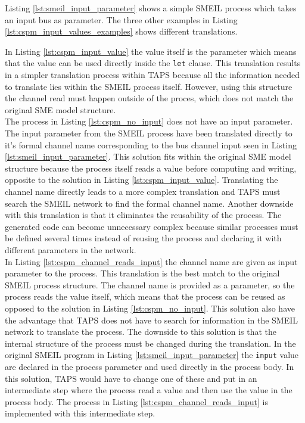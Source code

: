 Listing \ref{lst:smeil_input_parameter} shows a simple SMEIL process which takes an input bus as parameter. The three other examples in Listing \ref{lst:cspm_input_values_examples} shows different translations.

In Listing \ref{lst:cspm_input_value} the value itself is the parameter which means that the value can be used directly inside the \texttt{let} clause.
This translation results in a simpler translation process within TAPS because all the information needed to translate lies within the SMEIL process itself. However, using this structure the channel read must happen outside of the proces, which does not match the original SME model structure. \\

The \cspm{} process in Listing \ref{lst:cspm_no_input} does not have an input parameter. The input parameter from the SMEIL process have been translated directly to it's formal channel name corresponding to the bus channel input seen in Listing \ref{lst:smeil_input_parameter}. This solution fits within the original SME model structure because the process itself reads a value before computing and writing, opposite to the solution in Listing \ref{lst:cspm_input_value}. Translating the channel name directly leads to a more complex translation and TAPS must search the SMEIL network to find the formal channel name. Another downside with this translation is that it eliminates the reusability of the process. The generated code can become unnecessary complex because similar processes must be defined several times instead of reusing the process and declaring it with different parameters in the network.\\

In Listing \ref{lst:cspm_channel_reads_input} the channel name are given as input parameter to the \cspm{} process. This translation is the best match to the original SMEIL process structure. The channel name is provided as a parameter, so the process reads the value itself, which means that the process can be reused as opposed to the solution in Listing \ref{lst:cspm_no_input}. This solution also have the advantage that TAPS does not have to search for information in the SMEIL network to translate the process.
The downside to this solution is that the internal structure of the process must be changed during the translation. In the original SMEIL program in Listing \ref{lst:smeil_input_parameter} the \texttt{input} value are declared in the process parameter and used directly in the process body. In this solution, TAPS would have to change one of these and put in an intermediate step where the process read a value and then use the value in the process body. The process in Listing \ref{lst:cspm_channel_reads_input} is implemented with this intermediate step.\\

